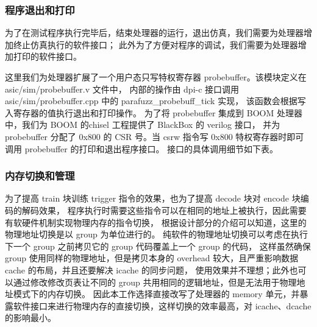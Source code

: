 \subsubsection{程序退出和打印}
为了在测试程序执行完毕后，结束处理器的运行，退出仿真，我们需要为处理器增加终止仿真执行的软件接口；
此外为了方便对程序的调试，我们需要为处理器增加打印的软件接口。\par

这里我们为处理器扩展了一个用户态只写特权寄存器 probebuffer。该模块定义在 asic/sim/probebuffer.v 文件中，
内部的操作由 dpi-c 接口调用 asic/sim/probebuffer.cpp 中的 parafuzz\_probebuff\_tick 实现，
该函数会根据写入寄存器的值执行退出和打印操作。
为了将 probebuffer 集成到 BOOM 处理器中，我们为 BOOM 的chisel 工程提供了 BlackBox 的 verilog 接口，
并为 probebuffer 分配了 0x800 的 CSR 号。当 csrw 指令写 0x800 特权寄存器时即可调用 probebuffer 的打印和退出程序接口。
接口的具体调用细节如下表。\par

\begin{table}[h!]
    \begin{center} 
    \caption{probebuffer 软件接口} 
    \label{table:probebuffer}  
    \end{center}
\end{table}

\subsubsection{内存切换和管理}
为了提高 train 块训练 trigger 指令的效果，也为了提高 decode 块对 encode 块编码的解码效果，
程序执行时需要这些指令可以在相同的地址上被执行，因此需要有软硬件机制实现物理内存的指令切换，
根据设计部分的介绍可以知道，这里的物理地址切换是以 group 为单位进行的。
纯软件的物理地址切换可以考虑在执行下一个 group 之前拷贝它的 group 代码覆盖上一个 group 的代码，
这样虽然确保 group 使用同样的物理地址，但是拷贝本身的 overhead 较大，且严重影响数据 cache 的布局，并且还要解决 icache 的同步问题，
使用效果并不理想；此外也可以通过修改修改页表让不同的 group 共用相同的逻辑地址，但是无法用于物理地址模式下的内存切换。
因此本工作选择直接改写了处理器的 memory 单元，并暴露软件接口来进行物理内存的直接切换，这样切换的效率最高，对 icache、dcache 的影响最小。\par

